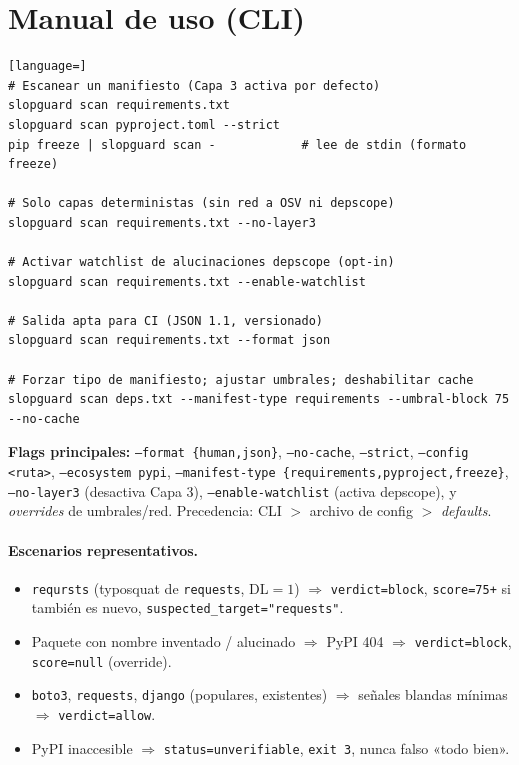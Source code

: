 \documentclass[11pt,a4paper]{article}
\begin{document}
\section{Manual de uso (CLI)}

\begin{lstlisting}[language=]
# Escanear un manifiesto (Capa 3 activa por defecto)
slopguard scan requirements.txt
slopguard scan pyproject.toml --strict
pip freeze | slopguard scan -            # lee de stdin (formato freeze)

# Solo capas deterministas (sin red a OSV ni depscope)
slopguard scan requirements.txt --no-layer3

# Activar watchlist de alucinaciones depscope (opt-in)
slopguard scan requirements.txt --enable-watchlist

# Salida apta para CI (JSON 1.1, versionado)
slopguard scan requirements.txt --format json

# Forzar tipo de manifiesto; ajustar umbrales; deshabilitar cache
slopguard scan deps.txt --manifest-type requirements --umbral-block 75 --no-cache
\end{lstlisting}

\noindent\textbf{Flags principales:} \texttt{--format \{human,json\}},
\texttt{--no-cache}, \texttt{--strict}, \texttt{--config <ruta>},
\texttt{--ecosystem pypi}, \texttt{--manifest-type \{requirements,pyproject,freeze\}},
\texttt{--no-layer3} (desactiva Capa 3), \texttt{--enable-watchlist} (activa depscope),
y \emph{overrides} de umbrales/red. Precedencia: CLI $>$ archivo de config $>$
\emph{defaults}.

\paragraph{Escenarios representativos.}

\begin{itemize}[nosep]
  \item \texttt{reqursts} (typosquat de \texttt{requests}, DL$=1$)
    $\Rightarrow$ \texttt{verdict=block}, \texttt{score=75+} si también es nuevo,
    \texttt{suspected_target="requests"}.
  \item Paquete con nombre inventado / alucinado $\Rightarrow$ PyPI 404
    $\Rightarrow$ \texttt{verdict=block}, \texttt{score=null} (override).
  \item \texttt{boto3}, \texttt{requests}, \texttt{django} (populares, existentes)
    $\Rightarrow$ señales blandas mínimas $\Rightarrow$ \texttt{verdict=allow}.
  \item PyPI inaccesible $\Rightarrow$ \texttt{status=unverifiable}, \texttt{exit 3},
    nunca falso «todo bien».
\end{itemize}
\end{document}
